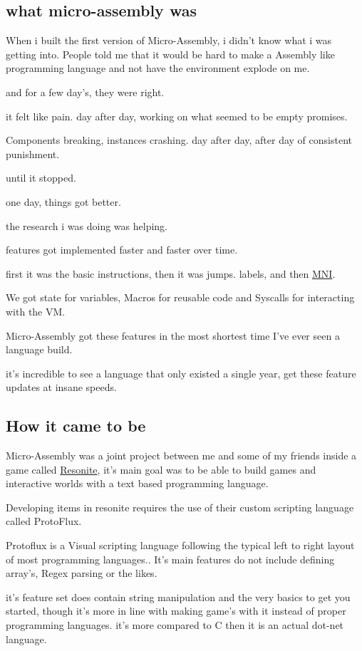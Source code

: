\documentclass[a4paper,11pt]{book}
\begin{document}
\subsection{what micro-assembly was}
When i built the first version of Micro-Assembly, i didn't know what i was getting into.
People told me that it would be hard to make a Assembly like programming language and not have the environment explode on me.

and for a few day's, they were right.

it felt like pain.
day after day, working on what seemed to be empty promises.

Components breaking, instances crashing.
day after day, after day of consistent punishment.

until it stopped.

one day, things got better.

the research i was doing was helping.

features got implemented faster and faster over time.

first it was the basic instructions, then it was jumps.
labels, and then \hyperref[subpar:MNI]{MNI}.

We got state for variables, Macros for reusable code and Syscalls for interacting with
the VM.

Micro-Assembly got these features in the most shortest time I've ever seen a language build.

it's incredible to see a language that only existed a single year, get these feature updates
at insane speeds.


\subsection{How it came to be}
Micro-Assembly was a joint project between me and some of my friends inside a game called
\hyperref{https://resonite.com}{}{}{Resonite}, it's main goal was to be able to build games and interactive 
worlds with a text based programming language.

Developing items in resonite requires the use of their custom scripting language called ProtoFlux.

Protoflux is a Visual scripting language following the typical left to right layout of most programming languages..
It's main features do not include defining array's, Regex parsing or the likes.

it's feature set does contain string manipulation and the very basics to get you started,
though it's more in line with making game's with it instead of proper programming languages.
it's more compared to C then it is an actual dot-net language.
\end{document}
